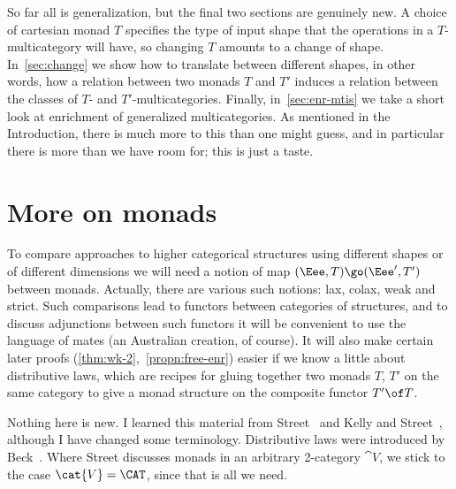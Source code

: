 So far all is generalization, but the final two sections are genuinely new.
A choice of cartesian monad $T$ specifies the type of input shape that the
operations in a $T$-multicategory will have, so changing $T$ amounts to a
change of shape.  In~\ref{sec:change} we show how to translate between
different shapes, in other words, how a relation between two monads $T$ and
$T'$ induces a relation between the classes of $T$- and
$T'$-multicategories.  Finally, in~\ref{sec:enr-mtis} we take a short look
at enrichment of generalized multicategories.  As mentioned in the
Introduction, there is much more to this than one might guess, and in
particular there is more than we have room for; this is just a taste.


\section{More on monads}
%
%
%

To compare approaches to higher categorical structures using different
shapes or of different dimensions we will need a notion of map $(\Eee, T)
\go (\Eee', T')$ between monads.  Actually, there are various such notions:
lax, colax, weak and strict.  Such comparisons lead to functors between
categories of structures, and to discuss adjunctions between such functors
it will be convenient to use the language of mates (an Australian
creation, of course).  It will also make certain later proofs
(\ref{thm:wk-2},~\ref{propn:free-enr}) easier if we know a little about
distributive laws, which are recipes for gluing together two monads $T$,
$T'$ on the same category to give a monad structure on the composite
functor $T'\of T$.

Nothing here is new.  I learned this material from Street~\cite{StrFTM}%
%
%
and
Kelly%
%
%
and Street~\cite{KSRE2},%
%
%
although I have changed some terminology.
Distributive laws were introduced by Beck~\cite{Beck}.%
%
%
 Where Street
discusses monads in an arbitrary 2-category $\cat{V}$, we stick to the case
$\cat{V} = \CAT$, since that is all we need.

